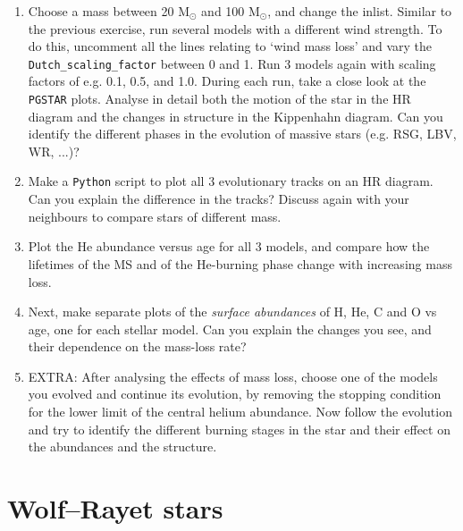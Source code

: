 \documentclass[11pt,a4paper]{article}
\begin{document}
\begin{enumerate}
\item Choose a mass between 20 M$_\odot$ and 100 M$_\odot$, and change the inlist. Similar to the previous exercise, run several models with a different wind strength. To do this, uncomment all the lines relating to `wind mass loss' and vary the \verb|Dutch_scaling_factor| between 0 and 1. Run 3 models again with scaling factors of e.g. 0.1, 0.5, and 1.0. During each run, take a close look at the \texttt{PGSTAR} plots. Analyse in detail both the motion of the star in the HR diagram and the changes in structure in the Kippenhahn diagram. Can you identify the different phases in the evolution of massive stars (e.g. RSG, LBV, WR, ...)? %

\item Make a \texttt{Python} script to plot all 3 evolutionary tracks on an HR diagram. Can you explain the difference in the tracks? Discuss again with your neighbours to compare stars of different mass.

\item Plot the He abundance versus age for all 3 models, and compare how the lifetimes of the MS and of the He-burning phase change with increasing mass loss.

\item Next, make separate plots of the \emph{surface abundances} of H, He, C and O vs age, one for each stellar model. Can you explain the changes you see, and their dependence on the mass-loss rate?

\item EXTRA: After analysing the effects of mass loss, choose one of the models you evolved and continue its evolution, by removing the stopping condition for the lower limit of the central helium abundance. 
Now follow the evolution and try to identify the different burning stages in the star and their effect on the abundances and the structure. 
\end{enumerate}


\section{Wolf–Rayet stars}
\end{document}
